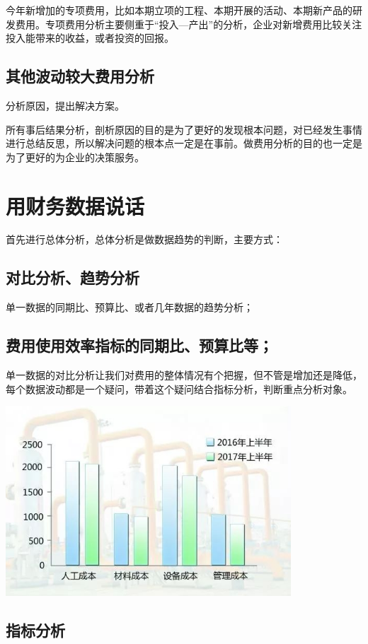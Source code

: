 \documentclass[linespread=1.5,a4paper]{ctexart}
\begin{document}
今年新增加的专项费用，比如本期立项的工程、本期开展的活动、本期新产品的研发费用。专项费用分析主要侧重于“投入—产出”的分析，企业对新增费用比较关注投入能带来的收益，或者投资的回报。

\subsection{其他波动较大费用分析}

分析原因，提出解决方案。

所有事后结果分析，剖析原因的目的是为了更好的发现根本问题，对已经发生事情进行总结反思，所以解决问题的根本点一定是在事前。做费用分析的目的也一定是为了更好的为企业的决策服务。

\section{用财务数据说话}

首先进行总体分析，总体分析是做数据趋势的判断，主要方式：

\subsection{对比分析、趋势分析}
单一数据的同期比、预算比、或者几年数据的趋势分析；
\subsection{费用使用效率指标的同期比、预算比等；}
单一数据的对比分析让我们对费用的整体情况有个把握，但不管是增加还是降低，每个数据波动都是一个疑问，带着这个疑问结合指标分析，判断重点分析对象。

\includegraphics[width=0.8\textwidth]{./figure/cost_diagram.jpeg}
\subsection{指标分析}
\end{document}
